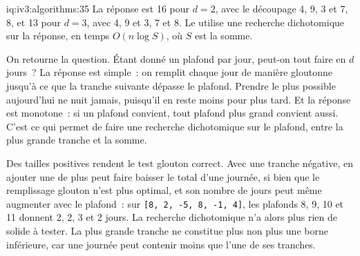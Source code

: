 \begin{solution}{iq:iv3:algorithms:35}
La réponse est 16 pour $d = 2$, avec le découpage 4, 9, 3 et 7, 8, et 13 pour $d = 3$, avec 4, 9 et 3, 7 et 8. Le  utilise une recherche dichotomique sur la réponse, en temps $O(n \log S)$, où $S$ est la somme.
\enlargethispage{-3\baselineskip}%
\label{lst:iv3:al:splitdays}

On retourne la question. Étant donné un plafond par jour, peut-on tout faire en $d$ jours~? La réponse est simple~: on remplit chaque jour de manière gloutonne jusqu'à ce que la tranche suivante dépasse le plafond. Prendre le plus possible aujourd'hui ne nuit jamais, puisqu'il en reste moins pour plus tard. Et la réponse est monotone~: si un plafond convient, tout plafond plus grand convient aussi. C'est ce qui permet de faire une recherche dichotomique sur le plafond, entre la plus grande tranche et la somme.

Des tailles positives rendent le test glouton correct. Avec une tranche négative, en ajouter une de plus peut faire baisser le total d'une journée, si bien que le remplissage glouton n'est plus optimal, et son nombre de jours peut même augmenter avec le plafond~: sur \texttt{[8, 2, -5, 8, -1, 4]}, les plafonds 8, 9, 10 et 11 donnent 2, 2, 3 et 2 jours. La recherche dichotomique n'a alors plus rien de solide à tester. La plus grande tranche ne constitue plus non plus une borne inférieure, car une journée peut contenir moins que l'une de ses tranches.

\end{solution}

